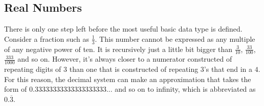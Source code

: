 \subsection{Real Numbers}
There is only one step left before the most useful basic data type is defined. Consider a fraction such as $\frac{1}{3}$. This number cannot be expressed as any multiple of any negative power of ten. It is recursively just a little bit bigger than $\frac{3}{10}$, $\frac{33}{100}$, $\frac{333}{1000}$ and so on. However, it's always closer to a numerator constructed of repeating digits of $3$ than one that is constructed of repeating $3$'s that end in a $4$. For this reason, the decimal system can make an approximation that takes the form of $0.33333333333333333333...$ and so on to infinity, which is abbreviated as $0.\overline{3}$.























